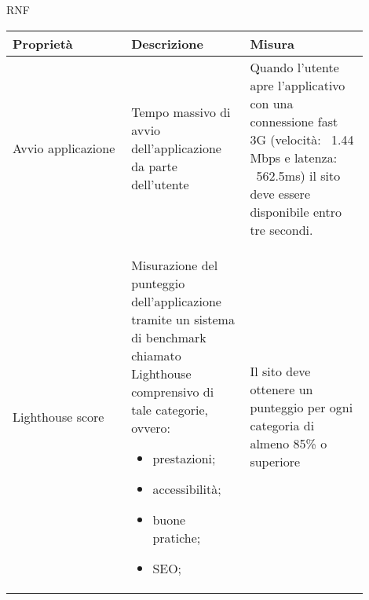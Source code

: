 \begin{listaPersonale}{RNF}
    \begin{tabular}{|p{0.3\linewidth}|p{0.3\linewidth}|p{0.3\linewidth}|}
        \hline
        \rowcolor{viola} \textbf{Proprietà}                           &
        \textbf{Descrizione}                                          &
        \textbf{Misura}                                                                  \\
        \hline
        Avvio applicazione                                            &
        Tempo massivo di avvio dell'applicazione da parte dell'utente &
        Quando l'utente apre l'applicativo con una connessione
        fast 3G (velocità: ~1.44 Mbps e latenza: ~562.5ms)
        il sito deve essere disponibile entro tre secondi.                               \\
        \hline
        Lighthouse score                                              &
        Misurazione del punteggio dell'applicazione tramite un
        sistema di benchmark chiamato Lighthouse comprensivo
        di tale categorie, ovvero:
        \begin{itemize}
            \item prestazioni;
            \item accessibilità;
            \item buone pratiche;
            \item SEO;
        \end{itemize}                                         &
        Il sito deve ottenere un punteggio per ogni categoria di almeno 85\% o superiore \\
        \hline
    \end{tabular}


\end{listaPersonale}
